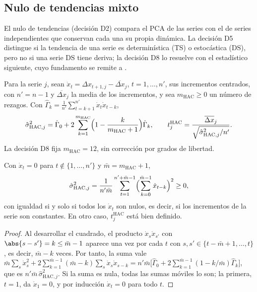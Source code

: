 \subsection{Nulo de tendencias mixto}
\label{sec:nulo-mixto}

El nulo de tendencias (decisión D2) compara el PCA de las series con el de series independientes
que conservan cada una su propia dinámica. La decisión D5 distingue si la tendencia de una serie es
determinística (TS) o estocástica (DS), pero no si una serie DS tiene deriva; la decisión D8 lo
resuelve con el estadístico siguiente, cuyo fundamento se remite a
\textcite{newey_west_1987}.

\begin{definicion}\label{def:hac}
Para la serie $j$, sean $\dot x_t=\Delta x_{t+1,j}-\overline{\Delta x}_j$, $t=1,\dots,n'$, sus
incrementos centrados, con $n'=n-1$ y $\overline{\Delta x}_j$ la media de los incrementos, y sea
$m_{\mathrm{HAC}}\ge0$ un número de rezagos. Con $\hat\Gamma_k=\frac1{n'}\sum_{t=k+1}^{n'}\dot x_t
\dot x_{t-k}$,
\[
  \hat\sigma^2_{\mathrm{HAC},j}=\hat\Gamma_0+2\sum_{k=1}^{m_{\mathrm{HAC}}}
  \Bigl(1-\frac{k}{m_{\mathrm{HAC}}+1}\Bigr)\hat\Gamma_k ,
  \qquad
  t^{\mathrm{HAC}}_j=\frac{\overline{\Delta x}_j}{\sqrt{\hat\sigma^2_{\mathrm{HAC},j}/n'}} .
\]
La decisión D8 fija $m_{\mathrm{HAC}}=12$, sin corrección por grados de libertad.
\end{definicion}

\begin{lema}\label{lem:hac}
Con $\dot x_t=0$ para $t\notin\{1,\dots,n'\}$ y $\bar m=m_{\mathrm{HAC}}+1$,
\[
  \hat\sigma^2_{\mathrm{HAC},j}=\frac{1}{n'\bar m}\sum_{t=1}^{n'+\bar m-1}
  \Bigl(\sum_{k=0}^{\bar m-1}\dot x_{t-k}\Bigr)^2\ge0,
\]
con igualdad si y solo si todos los $\dot x_t$ son nulos, es decir, si los incrementos de la serie
son constantes. En otro caso, $t^{\mathrm{HAC}}_j$ está bien definido.
\end{lema}

\begin{proof}
Al desarrollar el cuadrado, el producto $\dot x_s\dot x_{s'}$ con $\abs{s-s'}=k\le\bar m-1$
aparece una vez por cada $t$ con $s,s'\in\{t-\bar m+1,\dots,t\}$, es decir, $\bar m-k$ veces. Por
tanto, la suma vale
$\bar m\sum_s\dot x_s^2+2\sum_{k=1}^{\bar m-1}(\bar m-k)\sum_s\dot x_s\dot x_{s-k}
=n'\bar m\bigl[\hat\Gamma_0+2\sum_{k=1}^{\bar m-1}(1-k/\bar m)\hat\Gamma_k\bigr]$, que es
$n'\bar m\,\hat\sigma^2_{\mathrm{HAC},j}$. Si la suma es nula, todas las sumas móviles lo son; la
primera, $t=1$, da $\dot x_1=0$, y por inducción $\dot x_t=0$ para todo $t$.
\end{proof}

